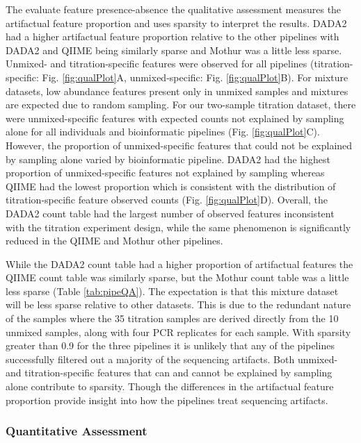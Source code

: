 \documentclass{bmcart}
\begin{document}
The evaluate feature presence-absence the qualitative assessment measures
the artifactual feature proportion and uses sparsity to interpret the results.
DADA2 had a higher artifactual feature proportion relative to the other
pipelines with DADA2 and QIIME being similarly sparse and Mothur was a little less sparse.
Unmixed- and titration-specific features were observed for all pipelines
(titration-specific: Fig. \ref{fig:qualPlot}A, unmixed-specific: Fig.
\ref{fig:qualPlot}B).
For mixture datasets, low abundance features
present only in unmixed samples and mixtures are expected due to random
sampling. For our two-sample titration dataset, there were
unmixed-specific features with expected counts not explained by sampling
alone for all individuals and bioinformatic pipelines (Fig.
\ref{fig:qualPlot}C). However, the proportion of unmixed-specific
features that could not be explained by sampling alone varied by
bioinformatic pipeline. DADA2 had the highest proportion of
unmixed-specific features not explained by sampling whereas QIIME had
the lowest proportion which is consistent with the distribution
of titration-specific feature observed counts (Fig. \ref{fig:qualPlot}D).
Overall, the DADA2 count table had the largest
number of observed features inconsistent with the titration experiment
design, while the same phenomenon is significantly reduced in the QIIME and Mothur other
pipelines.

While the DADA2 count table had a higher proportion of artifactual features the
QIIME count table was similarly sparse, but the Mothur count table was a little less sparse (Table \ref{tab:pipeQA}).
The expectation is that this mixture dataset will be less sparse relative to other datasets.
This is due to the redundant nature of the samples where the 35 titration samples are derived
directly from the 10 unmixed samples, along with four PCR replicates for
each sample. With sparsity greater than 0.9 for the three pipelines it
is unlikely that any of the pipelines successfully filtered out a
majority of the sequencing artifacts. Both unmixed- and titration-specific
features that can and cannot be explained by sampling alone contribute
to sparsity. Though the differences in the artifactual feature proportion
provide insight into how the pipelines treat sequencing artifacts.


\subsubsection*{Quantitative Assessment}
\end{document}
